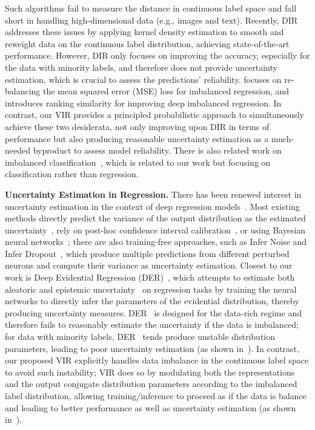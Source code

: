 Such algorithms fail to measure the distance in continuous label space and fall short in handling high-dimensional data (e.g., images and text). Recently, DIR~\citep{DIR} addresses these issues by applying kernel density estimation to smooth and reweight data on the continuous label distribution, achieving state-of-the-art performance. However, DIR only focuses on improving the accuracy, especially for the data with minority labels, and therefore does not provide uncertainty estimation, which is crucial to assess the predictions' reliability. \cite{balancedMSE} focuses on re-balancing the mean squared error (MSE) loss for imbalanced regression, and \cite{RankSim} introduces ranking similarity for improving deep imbalanced regression. {In contrast, our VIR provides a principled probabilistic approach to simultaneously achieve these two desiderata, not only improving upon DIR in terms of performance but also producing reasonable uncertainty estimation as a much-needed byproduct to assess model reliability.} There is also related work on imbalanced classification~\citep{Long-Tailed-Age-Classification}, which is related to our work but focusing on classification rather than regression.

\textbf{Uncertainty Estimation in Regression.}
{There has been renewed interest in uncertainty estimation in the context of deep regression models~\citep{DER,uncertain6,uncertain9,kendall2017uncertainties,kuleshov2018accurate,TFuncertainty,uncertain8,song2019distribution,uncertain7,zelikman2020crude}.} Most existing methods directly predict the variance of the output distribution as the estimated uncertainty~\citep{DER,kendall2017uncertainties,zhang2019reducing}, rely on post-hoc confidence interval calibration~\citep{kuleshov2018accurate,song2019distribution,zelikman2020crude}, or using Bayesian neural networks~\citep{NPN,BDL,BDLSurvey}; there are also training-free approaches, such as Infer Noise and Infer Dropout~\citep{TFuncertainty}, which produce multiple predictions from different perturbed neurons and compute their variance as uncertainty estimation. Closest to our work is Deep Evidential Regression (DER)~\citep{DER}, which attempts to estimate both aleatoric and epistemic uncertainty~\citep{Uncertainty4ML,kendall2017uncertainties} on regression tasks by training the neural networks to directly infer the parameters of the evidential distribution, thereby producing uncertainty measures. DER~\citep{DER} is designed for the data-rich regime and therefore fails to reasonably estimate the uncertainty if the data is imbalanced; for data with minority labels, DER~\citep{DER} tends produce unstable distribution parameters, leading to poor uncertainty estimation (as shown in~).  In contrast, our proposed VIR explicitly handles data imbalance in the continuous label space to avoid such instability; VIR does so by modulating both the representations and the output conjugate distribution parameters according to the imbalanced label distribution, allowing training/inference to proceed as if the data is balance and leading to better performance as well as uncertainty estimation (as shown in~).

